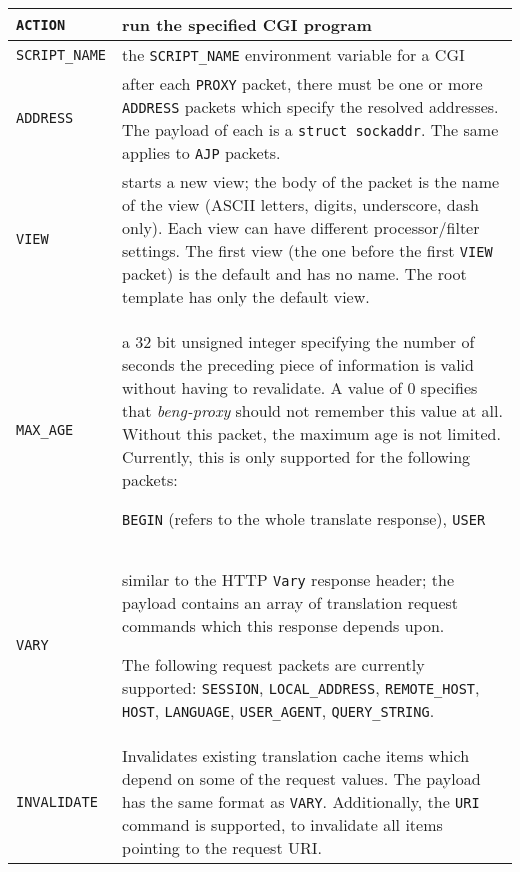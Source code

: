 \documentclass[a4paper,12pt]{article}
\begin{document}
\begin{longtable}{|l|p{8cm}|}
\texttt{ACTION} & run the specified CGI program \\

\hline

\texttt{SCRIPT\_NAME} & the \texttt{SCRIPT\_NAME} environment variable
for a CGI \\

\hline

\texttt{ADDRESS} & after each \texttt{PROXY} packet, there must be one
or more \texttt{ADDRESS} packets which specify the resolved addresses.
The payload of each is a \texttt{struct sockaddr}.
The same applies to \texttt{AJP} packets. \\

\hline

\texttt{VIEW} & starts a new view; the body of the packet is the name
of the view (ASCII letters, digits, underscore, dash only).  Each view
can have different processor/filter settings.  The first view (the one
before the first \texttt{VIEW} packet) is the default and has no
name.  The root template has only the default view. \\

\hline

\texttt{MAX\_AGE} & a 32 bit unsigned integer specifying the number of
seconds the preceding piece of information is valid without having to
revalidate.  A value of 0 specifies that \emph{beng-proxy} should not
remember this value at all.  Without this packet, the maximum age is
not limited.  Currently, this is only supported for the following
packets:

\texttt{BEGIN} (refers to the whole translate response), \texttt{USER}
\\

\hline

\texttt{VARY} & similar to the HTTP \texttt{Vary} response header;
the payload contains an array of translation request commands which
this response depends upon.

The following request packets are currently supported:
\texttt{SESSION},
\texttt{LOCAL\_ADDRESS},
\texttt{REMOTE\_HOST}, \texttt{HOST}, \texttt{LANGUAGE},
\texttt{USER\_AGENT}, \texttt{QUERY\_STRING}.

\\

\hline

\texttt{INVALIDATE} & Invalidates existing translation cache items
which depend on some of the request values.  The payload has the same
format as \texttt{VARY}.  Additionally, the \texttt{URI} command is
supported, to invalidate all items pointing to the request URI.


\end{longtable}
\end{document}
